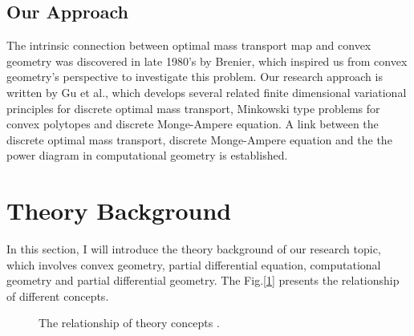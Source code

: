 \documentclass[runningheads]{llncs}
\begin{document}
\subsection{Our Approach}

The intrinsic connection between optimal mass transport map and convex geometry was discovered in late 1980's by Brenier\cite{brenier1991polar}, which inspired us from convex geometry's perspective to investigate this problem. Our research approach is written by Gu\cite{gu2013variational} et al., which develops several related finite dimensional variational principles for discrete optimal mass transport, Minkowski type problems for convex polytopes and discrete Monge-Ampere equation. A link between the discrete optimal mass transport, discrete Monge-Ampere equation and the the power diagram in computational geometry is established.


\section{ Theory Background }

In this section, I will introduce the theory background of our research topic, which involves convex geometry, partial differential equation, computational geometry and partial differential geometry. The Fig.[\ref{fig:pipeline}] presents the relationship of different concepts.


\begin{figure}
\centering
{}
\caption{The relationship of theory concepts .}
\label{fig:pipeline}
\end{figure}
\end{document}
